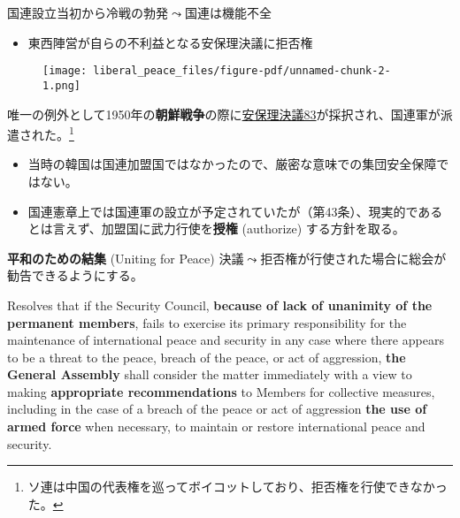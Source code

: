 \documentclass[
  xelatex,
  ja=standard]{bxjsarticle}
\providecommand{\tightlist}{%
  \setlength{\itemsep}{0pt}\setlength{\parskip}{0pt}}\usepackage{longtable,booktabs,array}
\begin{document}
国連設立当初から冷戦の勃発\(\leadsto\)国連は機能不全

\begin{itemize}
\tightlist
\item
  東西陣営が自らの不利益となる安保理決議に拒否権
\end{itemize}

\begin{figure}[htpb]

{\centering \texttt{[image: liberal\_peace\_files/figure-pdf/unnamed-chunk-2-1.png]}

}

\end{figure}

唯一の例外として1950年の\textbf{朝鮮戦争}の際に\href{https://ja.wikisource.org/wiki/\%E5\%9B\%BD\%E9\%9A\%9B\%E9\%80\%A3\%E5\%90\%88\%E5\%AE\%89\%E5\%85\%A8\%E4\%BF\%9D\%E9\%9A\%9C\%E7\%90\%86\%E4\%BA\%8B\%E4\%BC\%9A\%E6\%B1\%BA\%E8\%AD\%B083}{安保理決議83}が採択され、国連軍が派遣された。\footnote{ソ連は中国の代表権を巡ってボイコットしており、拒否権を行使できなかった。}

\begin{itemize}
\tightlist
\item
  当時の韓国は国連加盟国ではなかったので、厳密な意味での集団安全保障ではない。
\item
  国連憲章上では国連軍の設立が予定されていたが（第43条）、現実的であるとは言えず、加盟国に武力行使を\textbf{授権}
  (authorize) する方針を取る。
\end{itemize}

\textbf{平和のための結集} (Uniting for Peace)
決議\(\leadsto\)拒否権が行使された場合に総会が勧告できるようにする。

\begin{tcolorbox}[enhanced jigsaw, bottomtitle=1mm, left=2mm, arc=.35mm, leftrule=.75mm, colbacktitle=quarto-callout-note-color!10!white, colframe=quarto-callout-note-color-frame, colback=white, breakable, title=\textcolor{quarto-callout-note-color}{\faInfo}\hspace{0.5em}{平和のための結集決議　主文1}, titlerule=0mm, toptitle=1mm, rightrule=.15mm, bottomrule=.15mm, toprule=.15mm, coltitle=black, opacitybacktitle=0.6, opacityback=0]

Resolves that if the Security Council, \textbf{because of lack of
unanimity of the permanent members}, fails to exercise its primary
responsibility for the maintenance of international peace and security
in any case where there appears to be a threat to the peace, breach of
the peace, or act of aggression, \textbf{the General Assembly} shall
consider the matter immediately with a view to making
\textbf{appropriate recommendations} to Members for collective measures,
including in the case of a breach of the peace or act of aggression
\textbf{the use of armed force} when necessary, to maintain or restore
international peace and security.

\end{tcolorbox}
\end{document}

